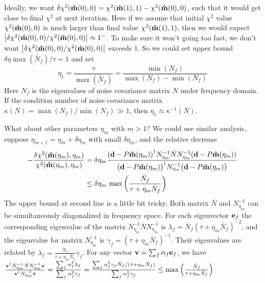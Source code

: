 \documentclass[11pt, letterpaper]{article}
\newcommand{\vbd}{\vb{d}}
\newcommand{\inv}[1]{#1^{-1}}
\newcommand{\hatm}{\vb{\hat{m}}}
\newcommand{\Nbar}{\bar{N}}
\begin{document}
Ideally, we want
$\delta \chi^2(\hatm(0),0) = \chi^2(\hatm(1), 1) - \chi^2(\hatm(0),0)$,
such that it would get close to final $\chi^2$ at next iteration.
Here if we assume that initial $\chi^2$ value $\chi^2(\hatm(0),0)$ is much
larger than final value $\chi^2(\hatm(1),1)$,
then we would expect
$\qty|\delta\chi^2(\hatm(0),0)/\chi^2(\hatm(0),0)| \approx 1^-$.
To make sure it won't going too fast, we don't want 
$\qty|\delta\chi^2(\hatm(0),0)/\chi^2(\hatm(0),0)|$ 
exceeds $1$.
So we could set upper bound $\delta \eta \max(\Nbar_f) / \tau = 1$
and set
\begin{equation}
\eta_1 = \frac{\tau}{\max(\Nbar_f)} = \frac{\min(N_f)}{\max(N_f) - \min(N_f)}
\end{equation}
Here $N_f$ is the eigenvalues of noise covariance matrix $N$ under frequency
domain.
If the condition number of noise covariance matrix
$\kappa(N) = \max(N_f)/\min(N_f) \gg 1$,
then $\eta_1 \approx \inv{\kappa} (N)$.

What about other parameters $\eta_m$ with $m > 1$?
We could use similar analysis,
suppose $\eta_{m+1} = \eta_m + \delta \eta_m$ with small $\delta\eta_m$,
and the relative decrease
\begin{align}
\begin{aligned}[b]
-\frac{\delta \chi^2(\hatm(\eta_m), \eta_m)}{\chi^2(\hatm(\eta_m), \eta_m)}  
&= \delta\eta_m
\frac{\qty(\vbd - P\hatm(\eta_m))^{\dagger}
    \inv{N_{\eta_m}} \Nbar \inv{N_{\eta_m}}
    (\vbd - P\hatm(\eta_m))
}
{\qty\big(\vbd - P \hatm(\eta_m))^{\dagger}
    \inv{N_{\eta_m}}
    \qty\big(\vbd - P\hatm(\eta_m))
}
\\
& \leq \delta \eta_m\, \max\qty(\frac{\Nbar_f}{\tau + \eta_m \Nbar_f})
\label{eta upper bound}
\end{aligned}
\end{align}
The upper bound at second line is a little bit tricky.
Both matrix $\Nbar$ and $\inv{N}_{\eta_m}$ 
can be simultaneously diagonalized in frequency space.
For each eigenvector $\vb{e}_f$
the corresponding eigenvalue of the matrix 
$\inv{N}_{\eta_m} \Nbar \inv{N}_{\eta_m}$
is
$\lambda_f = \Nbar_f (\tau + \eta_m \Nbar_f)^{-2}$,
and the eigenvalue for matrix 
$\inv{N}_{\eta_m}$
is
$\gamma_f = (\tau + \eta_m \Nbar_f)^{-1}$.
Their eigenvalues are related by
$\lambda_f = \frac{\Nbar_f}{\tau + \eta_m \Nbar_f} \gamma_f$.
For any vector $\vb{v} = \sum_f \alpha_f \vb{e}_f$, we have
$\frac{\vb{v}^{\dagger} \inv{N}_{\eta_m} \Nbar \inv{N}_{\eta_m} \vb{v}}
{\vb{v}^{\dagger} \inv{N}_{\eta_m} \vb{v}}
= \frac{\sum_f \alpha_f^2 \lambda_f}{\sum_f \alpha_f^2 \gamma_f}
= \frac{\sum_f \alpha_f^2 \gamma_f \Nbar_f/(\tau + \eta_m \Nbar_f)}
{\sum_f \alpha_f^2 \gamma_f}
\leq \max \qty( \frac{\Nbar_f}{\tau + \eta_m \Nbar_f})
$
\end{document}
